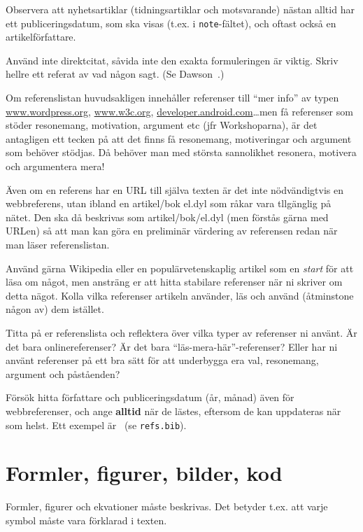 Observera att nyhetsartiklar (tidningsartiklar och motsvarande) nästan alltid har ett publiceringsdatum, som ska visas (t.ex. i \verb|note|-fältet), och oftast också en artikelförfattare.

Använd inte direktcitat, såvida inte den exakta formuleringen är viktig.  Skriv hellre ett referat av vad någon sagt. (Se Dawson~\cite{dawson:projects-in-computing,dawson:projects-in-computing-old}.)

Om referenslistan huvudsakligen innehåller referenser till ``mer info'' av typen 
\url{www.wordpress.org}, \url{www.w3c.org}, \url{developer.android.com}\ldots men få referenser som stöder resonemang, motivation, argument etc (jfr Workshoparna), är det antagligen ett tecken på att det finns få resonemang, motiveringar och argument som behöver stödjas. Då behöver man med största sannolikhet resonera, motivera och argumentera mera!

Även om en referens har en URL till själva texten är det inte nödvändigtvis en webbreferens, utan ibland en artikel/bok el.dyl som råkar vara tllgänglig på nätet. Den ska då beskrivas som artikel/bok/el.dyl (men förstås gärna med URLen) så att man kan göra en preliminär värdering av referensen redan när man läser referenslistan.

Använd gärna Wikipedia eller en populärvetenskaplig artikel som en \emph{start} för att läsa om något, men ansträng er att hitta stabilare referenser när ni skriver om detta nägot. Kolla vilka referenser artikeln använder, läs och använd (åtminstone någon av) dem istället.

Titta på er referenslista och reflektera över vilka typer av referenser ni använt. Är det bara onlinereferenser? Är det bara ``läs-mera-här''-referenser? Eller har ni använt referenser på ett bra sätt för att underbygga era val, resonemang, argument och påståenden?

Försök hitta författare och publiceringsdatum (år, månad) även för webbreferenser, och ange \textbf{alltid} när de lästes, eftersom de kan uppdateras när som helst. Ett exempel är~\cite{berners-lee:cool-uris} (se \texttt{refs.bib}).



\section{Formler, figurer, bilder, kod}
\label{sec:forml-figur-bild}

Formler, figurer och ekvationer måste beskrivas.  Det betyder t.ex. att varje symbol måste vara förklarad i texten.

